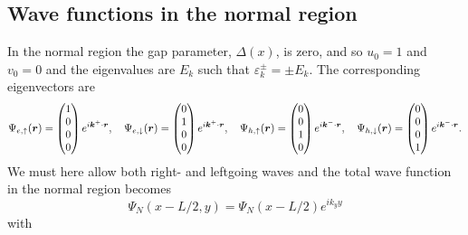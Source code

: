 \subsection{Wave functions in the normal region}
In the normal region the gap parameter, $\Delta(x)$, is zero, and so $u_0 = 1$ and $v_0 = 0$ and the eigenvalues are $E_{k}$ such that $\varepsilon^{\pm}_{k}= \pm E_k$. The corresponding eigenvectors are
\begin{equation}
\begin{split}
    \Psi_{e,\uparrow}(\boldsymbol{r}) = 
    \begin{pmatrix}
        1 \\ 0 \\ 0 \\ 0
    \end{pmatrix}e^{i\boldsymbol{k}^+\cdot \boldsymbol{r}},
    \quad
    \Psi_{e,\downarrow}(\boldsymbol{r}) = 
    \begin{pmatrix}
        0 \\ 1 \\ 0 \\0
    \end{pmatrix}e^{i\boldsymbol{k}^+\cdot\boldsymbol{r}},
    \quad
    \Psi_{h,\uparrow}(\boldsymbol{r}) = 
    \begin{pmatrix}
        0 \\ 0 \\ 1 \\0
    \end{pmatrix}e^{i\boldsymbol{k}^-\cdot\boldsymbol{r}},
    \quad
    \Psi_{h,\downarrow}(\boldsymbol{r}) = 
    \begin{pmatrix}
        0 \\ 0 \\ 0 \\ 1
    \end{pmatrix}e^{i\boldsymbol{k}^-\cdot\boldsymbol{r}}.
\end{split}
\end{equation}
We must here allow both right- and leftgoing waves and the total wave function in the normal region becomes
\begin{equation}
\Psi_N(x-L/2,y) = \Psi_N(x-L/2)e^{ik_yy}
\end{equation}
with
